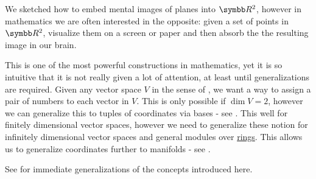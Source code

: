 \begin{remark}\label{remark:coordinate_systems}
  We sketched how to embed mental images of planes into \( \BR^2 \), however in mathematics we are often interested in the opposite: given a set of points in \( \BR^2 \), visualize them on a screen or paper and then absorb the the resulting image in our brain.

  This is one of the most powerful constructions in mathematics, yet it is so intuitive that it is not really given a lot of attention, at least until generalizations are required. Given any vector space \( V \) in the sense of , we want a way to assign a pair of numbers to each vector in \( V \). This is only possible if \( \dim V = 2 \), however we can generalize this to tuples of coordinates via bases - see . This well for finitely dimensional vector spaces, however we need to generalize these notion for infinitely dimensional vector spaces and general modules over \hyperref[def:left_module]{rings}. This allows us to generalize coordinates further to manifolds - see .

  See  for immediate generalizations of the concepts introduced here.
\end{remark}
